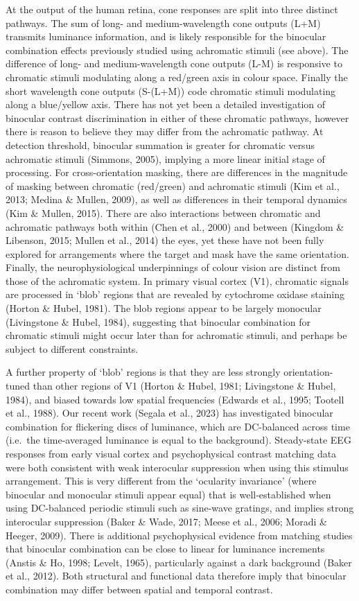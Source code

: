 \documentclass[
  letterpaper,
  DIV=11,
  numbers=noendperiod]{scrartcl}
\begin{document}
At the output of the human retina, cone responses are split into three
distinct pathways. The sum of long- and medium-wavelength cone outputs
(L+M) transmits luminance information, and is likely responsible for the
binocular combination effects previously studied using achromatic
stimuli (see above). The difference of long- and medium-wavelength cone
outputs (L-M) is responsive to chromatic stimuli modulating along a
red/green axis in colour space. Finally the short wavelength cone
outputs (S-(L+M)) code chromatic stimuli modulating along a blue/yellow
axis. There has not yet been a detailed investigation of binocular
contrast discrimination in either of these chromatic pathways, however
there is reason to believe they may differ from the achromatic pathway.
At detection threshold, binocular summation is greater for chromatic
versus achromatic stimuli (Simmons, 2005), implying a more linear
initial stage of processing. For cross-orientation masking, there are
differences in the magnitude of masking between chromatic (red/green)
and achromatic stimuli (Kim et al., 2013; Medina \& Mullen, 2009), as
well as differences in their temporal dynamics (Kim \& Mullen, 2015).
There are also interactions between chromatic and achromatic pathways
both within (Chen et al., 2000) and between (Kingdom \& Libenson, 2015;
Mullen et al., 2014) the eyes, yet these have not been fully explored
for arrangements where the target and mask have the same orientation.
Finally, the neurophysiological underpinnings of colour vision are
distinct from those of the achromatic system. In primary visual cortex
(V1), chromatic signals are processed in `blob' regions that are
revealed by cytochrome oxidase staining (Horton \& Hubel, 1981). The
blob regions appear to be largely monocular (Livingstone \& Hubel,
1984), suggesting that binocular combination for chromatic stimuli might
occur later than for achromatic stimuli, and perhaps be subject to
different constraints.

A further property of `blob' regions is that they are less strongly
orientation-tuned than other regions of V1 (Horton \& Hubel, 1981;
Livingstone \& Hubel, 1984), and biased towards low spatial frequencies
(Edwards et al., 1995; Tootell et al., 1988). Our recent work (Segala et
al., 2023) has investigated binocular combination for flickering discs
of luminance, which are DC-balanced across time (i.e.~the time-averaged
luminance is equal to the background). Steady-state EEG responses from
early visual cortex and psychophysical contrast matching data were both
consistent with weak interocular suppression when using this stimulus
arrangement. This is very different from the `ocularity invariance'
(where binocular and monocular stimuli appear equal) that is
well-established when using DC-balanced periodic stimuli such as
sine-wave gratings, and implies strong interocular suppression (Baker \&
Wade, 2017; Meese et al., 2006; Moradi \& Heeger, 2009). There is
additional psychophysical evidence from matching studies that binocular
combination can be close to linear for luminance increments (Anstis \&
Ho, 1998; Levelt, 1965), particularly against a dark background (Baker
et al., 2012). Both structural and functional data therefore imply that
binocular combination may differ between spatial and temporal contrast.
\end{document}
